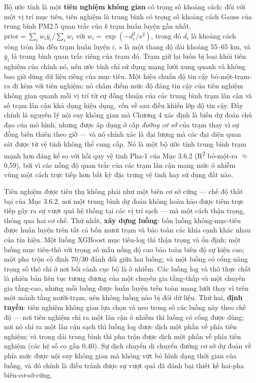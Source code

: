 Bộ ước tính là một \textbf{tiên nghiệm không gian} có trọng số khoảng cách: đối với một vị trí mục tiêu, tiên nghiệm là trung bình có trọng số khoảng cách Gauss của trung bình PM2.5 quan trắc của \emph{k} trạm huấn luyện gần nhất, $\text{prior} = \sum_i w_i \bar{y}_i / \sum_i w_i$ với $w_i = \exp(-d_i^2/s^2)$, trong đó $d_i$ là khoảng cách vòng tròn lớn đến trạm huấn luyện $i$, $s$ là một thang độ dài khoảng 55--65 km, và $\bar{y}_i$ là trung bình quan trắc riêng của trạm đó. Trạm giữ lại luôn bị loại khỏi tiên nghiệm của chính nó, nên ước tính chỉ sử dụng mạng lưới xung quanh và không bao giờ dùng dữ liệu riêng của mục tiêu. Một hiệu chuẩn độ tin cậy bỏ-một-trạm-ra đi kèm với tiên nghiệm: nó chấm điểm mức độ đáng tin cậy của tiên nghiệm không gian quanh mỗi vị trí từ sự đồng thuận của các trung bình trạm lân cận và số trạm lân cận khả dụng hiệu dụng, vốn về sau điều khiển lớp độ tin cậy. Đây chính là nguyên lý nội suy không gian mà Chương 4 xác định là biến dự đoán chủ đạo của mô hình, nhưng được áp dụng ở cấp \emph{đường cơ sở} của trạm thay vì sự đồng biến thiên theo giờ --- và nó chính xác là đại lượng mà các đại diện quan sát được từ vệ tinh không thể cung cấp. Nó là một bộ ước tính trung bình trạm mạnh hơn đáng kể so với hồi quy vệ tinh Pha-1 của Mục 3.6.2 (R\textsuperscript{2} bỏ-một-ra $\approx$ 0,59), bởi vì các nồng độ quan trắc của các trạm lân cận mang mức ô nhiễm vùng một cách trực tiếp hơn bất kỳ đặc trưng vệ tinh hay sử dụng đất nào.

Tiên nghiệm được tiêu thụ không phải như một biên cơ sở cứng --- chế độ thất bại của Mục 3.6.2, nơi một trung bình dự đoán không hoàn hảo được tiêm trực tiếp gây ra sự vượt quá hệ thống tại các vị trí sạch --- mà một cách thận trọng, thông qua hai cơ chế. Thứ nhất, \textbf{xây dựng luồng}: bốn luồng không-mục-tiêu được huấn luyện trên tất cả bốn mươi trạm và bảo toàn các khía cạnh khác nhau của tín hiệu. Một luồng XGBoost mục tiêu-log thì thận trọng và ổn định; một luồng mục tiêu-thô với trọng số mẫu nồng độ cao bảo toàn biên độ sự kiện cao; một pha trộn cố định 70/30 đánh đổi giữa hai luồng; và một luồng có cổng nâng trọng số thô chỉ ở nơi bối cảnh cục bộ là ô nhiễm. Các luồng log và thô thực chất là phiên bản liên tục tương đương của một chuyên gia tầng-thấp và một chuyên gia tầng-cao, nhưng mỗi luồng được huấn luyện trên toàn mạng lưới thay vì trên một mảnh tầng mười-trạm, nên không luồng nào bị đói dữ liệu. Thứ hai, \textbf{định tuyến}: tiên nghiệm không gian lựa chọn và neo trong số các luồng này theo chế độ --- nơi tiên nghiệm chỉ ra một lân cận ô nhiễm thì luồng có cổng được dùng; nơi nó chỉ ra một lân cận sạch thì luồng log được dịch một phần về phía tiên nghiệm; và trong dải trung bình thì pha trộn được dịch một phần về phía tiên nghiệm (các hệ số co gần 0,40). Sự dịch chuyển di chuyển đường cơ sở dự đoán về phía mức được nội suy không gian mà không vứt bỏ hình dạng thời gian của luồng, và đó chính là điều tránh được sự vượt quá đã đánh bại thiết kế hai-pha biên-cơ-sở-cứng.

